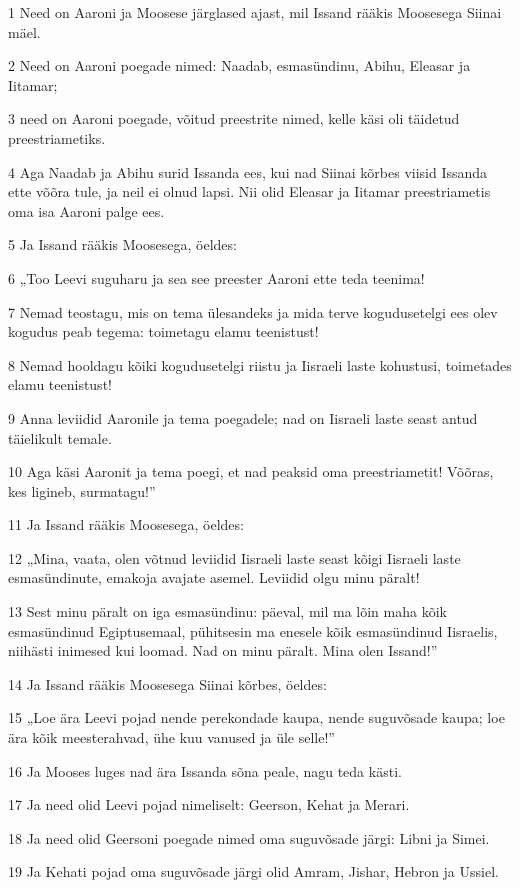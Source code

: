 \par 1 Need on Aaroni ja Moosese järglased ajast, mil Issand rääkis Moosesega Siinai mäel.
\par 2 Need on Aaroni poegade nimed: Naadab, esmasündinu, Abihu, Eleasar ja Iitamar;
\par 3 need on Aaroni poegade, võitud preestrite nimed, kelle käsi oli täidetud preestriametiks.
\par 4 Aga Naadab ja Abihu surid Issanda ees, kui nad Siinai kõrbes viisid Issanda ette võõra tule, ja neil ei olnud lapsi. Nii olid Eleasar ja Iitamar preestriametis oma isa Aaroni palge ees.
\par 5 Ja Issand rääkis Moosesega, öeldes:
\par 6 „Too Leevi suguharu ja sea see preester Aaroni ette teda teenima!
\par 7 Nemad teostagu, mis on tema ülesandeks ja mida terve kogudusetelgi ees olev kogudus peab tegema: toimetagu elamu teenistust!
\par 8 Nemad hooldagu kõiki kogudusetelgi riistu ja Iisraeli laste kohustusi, toimetades elamu teenistust!
\par 9 Anna leviidid Aaronile ja tema poegadele; nad on Iisraeli laste seast antud täielikult temale.
\par 10 Aga käsi Aaronit ja tema poegi, et nad peaksid oma preestriametit! Võõras, kes ligineb, surmatagu!”
\par 11 Ja Issand rääkis Moosesega, öeldes:
\par 12 „Mina, vaata, olen võtnud leviidid Iisraeli laste seast kõigi Iisraeli laste esmasündinute, emakoja avajate asemel. Leviidid olgu minu päralt!
\par 13 Sest minu päralt on iga esmasündinu: päeval, mil ma lõin maha kõik esmasündinud Egiptusemaal, pühitsesin ma enesele kõik esmasündinud Iisraelis, niihästi inimesed kui loomad. Nad on minu päralt. Mina olen Issand!”
\par 14 Ja Issand rääkis Moosesega Siinai kõrbes, öeldes:
\par 15 „Loe ära Leevi pojad nende perekondade kaupa, nende suguvõsade kaupa; loe ära kõik meesterahvad, ühe kuu vanused ja üle selle!”
\par 16 Ja Mooses luges nad ära Issanda sõna peale, nagu teda kästi.
\par 17 Ja need olid Leevi pojad nimeliselt: Geerson, Kehat ja Merari.
\par 18 Ja need olid Geersoni poegade nimed oma suguvõsade järgi: Libni ja Simei.
\par 19 Ja Kehati pojad oma suguvõsade järgi olid Amram, Jishar, Hebron ja Ussiel.
